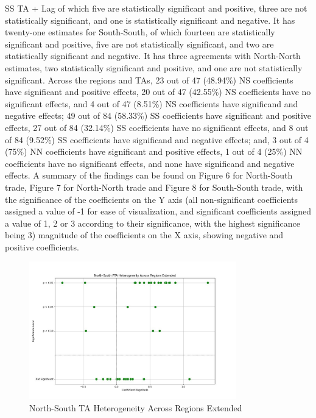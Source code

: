 \documentclass[12pt]{article}%
\begin{document}
SS TA + Lag of which five are statistically significant and positive,
three are not statistically significant, and one is statistically
significant and negative. It has twenty-one estimates for South-South,
of which fourteen are statistically significant and positive, five are
not statistically significant, and two are statistically significant and
negative. It has three agreements with North-North estimates, two
statistically significant and positive, and one are not statistically
significant. Across the regions and TAs, 23 out of 47 (48.94\%) NS
coefficients have significant and positive effects, 20 out of 47
(42.55\%) NS coefficients have no significant effects, and 4 out of 47 (8.51\%) NS
coefficients have significand and negative effects; 49 out of 84 (58.33\%) SS coefficients
have significant and positive effects, 27 out of 84 (32.14\%) SS coefficients have no
significant effects, and 8 out of 84 (9.52\%) SS coefficients have significand and
negative effects; and, 3 out of 4 (75\%) NN coefficients have
significant and positive effects, 1 out of 4 (25\%) NN coefficients have no significant
effects, and none have significand and negative effects. A summary of
the findings can be found on Figure 6 for North-South trade, Figure 7 for
North-North trade and Figure 8 for South-South trade, with the
significance of the coefficients on the Y axis (all non-significant
coefficients assigned a value of -1 for ease of visualization, and
significant coefficients assigned a value of 1, 2 or 3 according to
their significance, with the highest significance being 3) magnitude of
the coefficients on the X axis, showing negative and positive
coefficients.
%


\begin{figure}[h!]%
\centering%
\includegraphics[width=0.8\textwidth]{figures/North-South_trade_relationships_visualization.jpeg}%
\caption{North{-}South TA Heterogeneity Across Regions Extended}%
\end{figure}
\end{document}
